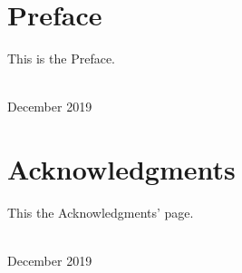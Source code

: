 \clearpage
 
 
 
 
\blankpage

{
\chapter*{Preface}
\thispagestyle{plain}

\noindent
This is the Preface.


\vspace*{2pc}
\noindent\AUTHORS\\
\noindent December 2019
}

\clearpage




\blankpage

\chapter*{Acknowledgments}
\thispagestyle{plain}

\noindent
This the Acknowledgments' page.

\vspace*{2pc}
\noindent\AUTHORS\\
\noindent December 2019
 
\clearpage

\blankpage

